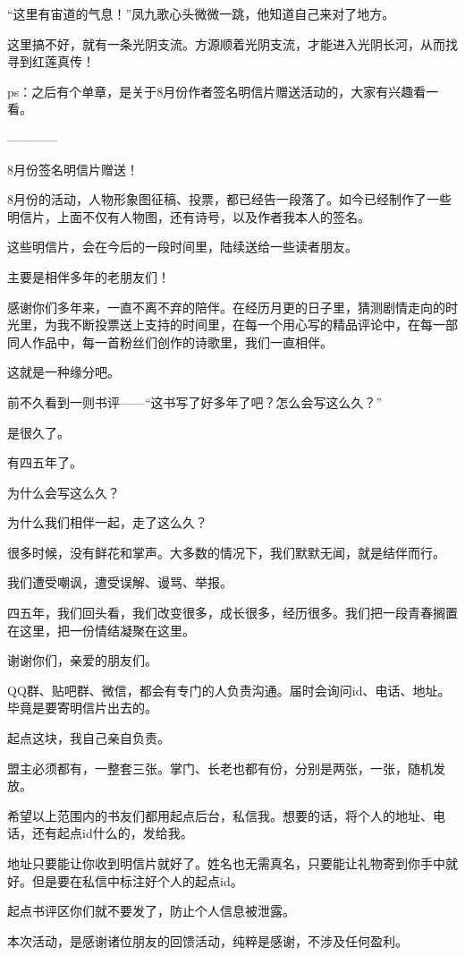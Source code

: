 \begin{this_body}
“这里有宙道的气息！”凤九歌心头微微一跳，他知道自己来对了地方。

这里搞不好，就有一条光阴支流。方源顺着光阴支流，才能进入光阴长河，从而找寻到红莲真传！

ps：之后有个单章，是关于8月份作者签名明信片赠送活动的，大家有兴趣看一看。

------------

8月份签名明信片赠送！

8月份的活动，人物形象图征稿、投票，都已经告一段落了。如今已经制作了一些明信片，上面不仅有人物图，还有诗号，以及作者我本人的签名。

这些明信片，会在今后的一段时间里，陆续送给一些读者朋友。

主要是相伴多年的老朋友们！

感谢你们多年来，一直不离不弃的陪伴。在经历月更的日子里，猜测剧情走向的时光里，为我不断投票送上支持的时间里，在每一个用心写的精品评论中，在每一部同人作品中，每一首粉丝们创作的诗歌里，我们一直相伴。

这就是一种缘分吧。

前不久看到一则书评——“这书写了好多年了吧？怎么会写这么久？”

是很久了。

有四五年了。

为什么会写这么久？

为什么我们相伴一起，走了这么久？

很多时候，没有鲜花和掌声。大多数的情况下，我们默默无闻，就是结伴而行。

我们遭受嘲讽，遭受误解、谩骂、举报。

四五年，我们回头看，我们改变很多，成长很多，经历很多。我们把一段青春搁置在这里，把一份情结凝聚在这里。

谢谢你们，亲爱的朋友们。

QQ群、贴吧群、微信，都会有专门的人负责沟通。届时会询问id、电话、地址。毕竟是要寄明信片出去的。

起点这块，我自己亲自负责。

盟主必须都有，一整套三张。掌门、长老也都有份，分别是两张，一张，随机发放。

希望以上范围内的书友们都用起点后台，私信我。想要的话，将个人的地址、电话，还有起点id什么的，发给我。

地址只要能让你收到明信片就好了。姓名也无需真名，只要能让礼物寄到你手中就好。但是要在私信中标注好个人的起点id。

起点书评区你们就不要发了，防止个人信息被泄露。

本次活动，是感谢诸位朋友的回馈活动，纯粹是感谢，不涉及任何盈利。


\end{this_body}
